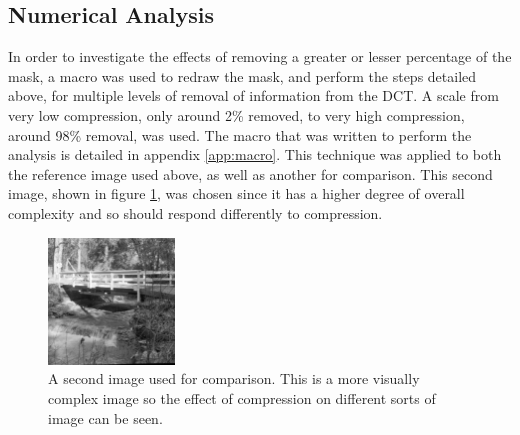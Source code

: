 \subsection{Numerical Analysis} %
\label{sub:numerical_analysis}
In order to investigate the effects of removing a greater or lesser percentage of the mask, a macro was used to redraw the mask, and perform the steps detailed above, for multiple levels of removal of information from the DCT. A scale from very low compression, only around 2\% removed, to very high compression, around 98\% removal, was used. The macro that was written to perform the analysis is detailed in appendix \ref{app:macro}. This technique was applied to both the reference image used above, as well as another for comparison. This second image, shown in figure \ref{fig:bridge_original}, was chosen since it has a higher degree of overall complexity and so should respond differently to compression.
\begin{figure}[ht]
	\centering
	\includegraphics[width=0.3\textwidth]{bridge.png}
	\caption{A second image used for comparison. This is a more visually complex image so the effect of compression on different sorts of image can be seen.\label{fig:bridge_original}}
\end{figure}

